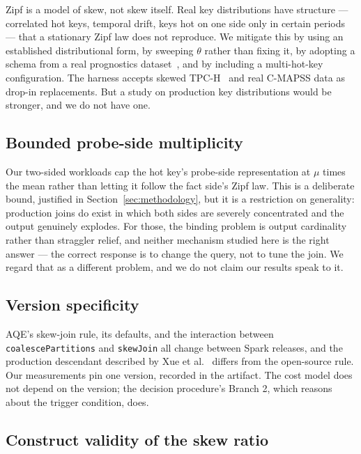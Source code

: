 Zipf is a model of skew, not skew itself. Real key distributions have
structure --- correlated hot keys, temporal drift, keys hot on one side only in
certain periods --- that a stationary Zipf law does not reproduce. We mitigate
this by using an established distributional form, by sweeping $\theta$ rather
than fixing it, by adopting a schema from a real prognostics
dataset~\cite{saxena2008cmapss}, and by including a multi-hot-key
configuration. The harness accepts skewed TPC-H~\cite{microsoft_skewgen} and
real C-MAPSS data as drop-in replacements. But a study on production key
distributions would be stronger, and we do not have one.

\subsection{Bounded probe-side multiplicity}

Our two-sided workloads cap the hot key's probe-side representation at $\mu$
times the mean rather than letting it follow the fact side's Zipf law. This is
a deliberate bound, justified in Section~\ref{sec:methodology}, but it is a
restriction on generality: production joins do exist in which both sides are
severely concentrated and the output genuinely explodes. For those, the binding
problem is output cardinality rather than straggler relief, and neither
mechanism studied here is the right answer --- the correct response is to
change the query, not to tune the join. We regard that as a different problem,
and we do not claim our results speak to it.

\subsection{Version specificity}

AQE's skew-join rule, its defaults, and the interaction between
\texttt{coalescePartitions} and \texttt{skewJoin} all change between Spark
releases, and the production descendant described by Xue et
al.~\cite{xue2024adaptive} differs from the open-source rule. Our measurements
pin one version, recorded in the artifact. The cost model does not depend on
the version; the decision procedure's Branch 2, which reasons about the trigger
condition, does.

\subsection{Construct validity of the skew ratio}

